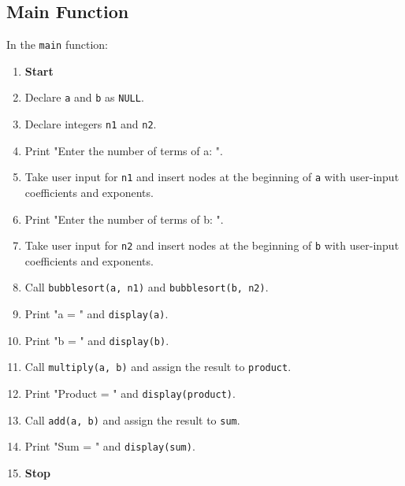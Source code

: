 {  \subsection{Main Function}
  In the \texttt{main} function:
  \begin{enumerate}[label=\arabic*:, start=1]
    \item \textbf{Start}
    \item Declare \texttt{a} and \texttt{b} as \texttt{NULL}.
    \item Declare integers \texttt{n1} and \texttt{n2}.
    \item Print "Enter the number of terms of a: ".
    \item Take user input for \texttt{n1} and insert nodes at the beginning of \texttt{a} with user-input \newline coefficients and exponents.
    \item Print "Enter the number of terms of b: ".
    \item Take user input for \texttt{n2} and insert nodes at the beginning of \texttt{b} with user-input \newline coefficients and exponents.
    \item Call \texttt{bubblesort(a, n1)} and \texttt{bubblesort(b, n2)}.
    \item Print "a = " and \texttt{display(a)}.
    \item Print "b = " and \texttt{display(b)}.
    \item Call \texttt{multiply(a, b)} and assign the result to \texttt{product}.
    \item Print "Product = " and \texttt{display(product)}.
    \item Call \texttt{add(a, b)} and assign the result to \texttt{sum}.
    \item Print "Sum = " and \texttt{display(sum)}.
    \item \textbf{Stop}
  \end{enumerate}
 }

